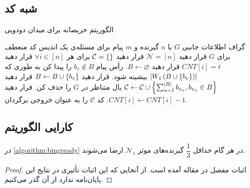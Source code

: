 \subsection{شبه کد}
\begin{algorithm}[H]
    \caption[
        الگوریتم حریصانه برای میدان دودویی
    ]{
        الگوریتم حریصانه برای میدان دودویی
        \cite{pliable2016}
    }
    \label{algorithm:bingready}
    \begin{algorithmic}[1]
        \Require
        گراف اطلاعات جانبی
        $G$
        با
        $n$
        گیرنده و
        $m$
        پیام برای مسئله‌ی
        \Ensure
        یک اندیس کد منعطف برای
        $G$
        \State
        قرار دهید
        $\mathcal{N} = [n]$
        \State
        قرار دهید
        $\mathcal{C} = \left\{  \right\}$
        \State
        برای هر
        $\forall i \in [n]$
        قرار دهید
        $CNT[i] = t$
            \State قرار دهید
            $B \leftarrow \varnothing$.
                \State
                رأس پیام
                $b_v \notin B$
                را پیدا کن به طوری که
                $\left|{W_1\left(B \cup\left\{ b_v \right\}\right)}\right|$
                بیشینه شود.
                \State قرار دهید
                $B \leftarrow B \cup\left\{ b_v \right\}$
            \EndWhile
            \State قرار دهید
            $\mathcal{C} \leftarrow \mathcal{C} \cup\left\{ \sum_{u=1}^{\left|{B}\right|} b_{v_u}, b_{v_u} \in B \right\}$
                    \State
                    یال متناظر در
                    $G$
                    را حذف کن.
                \EndIf
                \State
                قرار دهید
                $CNT[i] \leftarrow CNT[i]-1$.
            \EndFor
        \EndWhile
        \State کد
        $\mathcal{C}$
        را به عنوان خروجی برگردان.
    \end{algorithmic}
\end{algorithm}


\subsection{
    کارایی الگوریتم
}
\begin{lemma}
    \label{lemma:pliable2016:lemma2}
    در
    \autoref{algorithm:bingready}
    در هر گام حداقل
    $\dfrac{1}{3}$
    گیرنده‌های موثر
    $\mathcal{N}_s$
    ارضا می‌شوند.
\end{lemma}
\begin{proof}
    اثبات مفصل در مقاله آمده است. از آنجایی که این اثبات تأثیری در نتایج این پایان‌نامه ندارد از آن گذر می‌کنیم.
\end{proof}

